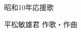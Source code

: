 \documentclass[10pt,b5j]{tarticle} %
\begin{document}
\begin{minipage}[c]{0.7\hsize} %
    \begin{center}
        {\LARGE
            昭和10年応援歌 %
        }
        {\small 
        }
    \end{center}
\end{minipage}
\begin{minipage}[c]{0.3\hsize} %
    \begin{flushright} %
        平松敏雄君 作歌・作曲 %
    \end{flushright}
\end{minipage}
\end{document}
